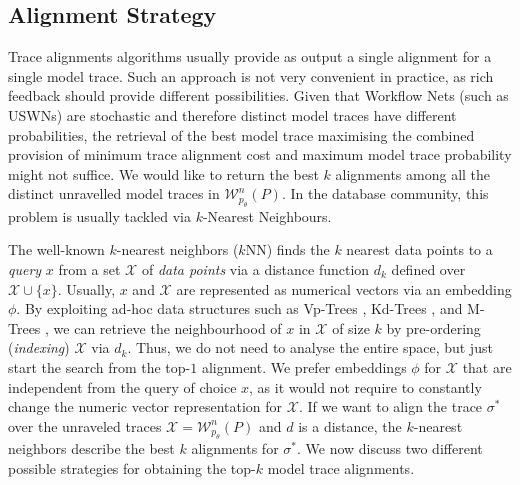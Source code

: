 
\subsection{Alignment Strategy}
Trace alignments algorithms usually provide as output a single alignment for a single model trace. Such an approach is not very convenient in practice, as rich feedback should provide different possibilities. Given that Workflow Nets (such as USWNs) are stochastic and therefore distinct model traces have different probabilities, the retrieval of the best model trace maximising the combined provision of minimum trace alignment cost and maximum model trace probability might not suffice. We would 
like to return the best $k$ alignments among all the distinct unravelled model traces in $\mathcal{W}^n_{p_\theta}(P)$. In the database community, this problem is usually tackled via $k$-Nearest Neighbours.

The well-known $k$-nearest neighbors ($k$NN) \cite{Altman} finds the $k$ nearest data points to a \textit{query} $x$ from a set $\mathcal{X}$ of \textit{data points} via a distance function $d_k$ defined over $\mathcal{X}\cup\{x\}$. Usually, $x$ and $\mathcal{X}$ are represented as numerical vectors via an embedding $\phi$. {By exploiting ad-hoc data structures such as Vp-Trees \cite{Fu2000}, Kd-Trees \cite{Maneewongvatana99}, and M-Trees \cite{Ciaccia}, we can retrieve the neighbourhood of $x$ in $\mathcal{X}$ of size $k$  by pre-ordering (\textit{indexing}) $\mathcal{X}$  via $d_k$. Thus, we do not need to analyse the entire space, but just start the search from the top-$1$ alignment. We prefer embeddings $\phi$ for $\mathcal{X}$ that are independent from the query of choice $x$, as it would not require to constantly change the numeric vector representation for $\mathcal{X}$.
%	
If we want to align the trace $\sigma^*$ over the unraveled traces $\mathcal{X}=\mathcal{W}^n_{p_\theta}(P)$ and $d$ is a distance, the $k$-nearest neighbors describe the best $k$ alignments for $\sigma^*$.} We now discuss two different possible strategies for obtaining the top-$k$ model trace alignments.

